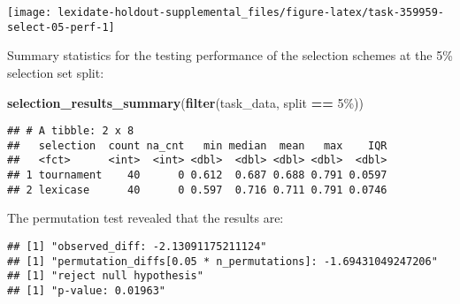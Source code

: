 \documentclass[
]{book}
\newenvironment{Shaded}{\begin{snugshade}}{\end{snugshade}}
\newcommand{\AttributeTok}[1]{\textcolor[rgb]{0.13,0.29,0.53}{#1}}
\newcommand{\DecValTok}[1]{\textcolor[rgb]{0.00,0.00,0.81}{#1}}
\newcommand{\FunctionTok}[1]{\textcolor[rgb]{0.13,0.29,0.53}{\textbf{#1}}}
\newcommand{\NormalTok}[1]{#1}
\newcommand{\OtherTok}[1]{\textcolor[rgb]{0.56,0.35,0.01}{#1}}
\newcommand{\SpecialCharTok}[1]{\textcolor[rgb]{0.81,0.36,0.00}{\textbf{#1}}}
\newcommand{\StringTok}[1]{\textcolor[rgb]{0.31,0.60,0.02}{#1}}
\begin{document}
\texttt{[image: lexidate-holdout-supplemental\_files/figure-latex/task-359959-select-05-perf-1]}

Summary statistics for the testing performance of the selection schemes at the 5\% selection set split:

\begin{Shaded}
\begin{Highlighting}[]
\FunctionTok{selection\_results\_summary}\NormalTok{(}\FunctionTok{filter}\NormalTok{(task\_data, split }\SpecialCharTok{==} \StringTok{\textquotesingle{}5\%\textquotesingle{}}\NormalTok{))}
\end{Highlighting}
\end{Shaded}

\begin{verbatim}
## # A tibble: 2 x 8
##   selection  count na_cnt   min median  mean   max    IQR
##   <fct>      <int>  <int> <dbl>  <dbl> <dbl> <dbl>  <dbl>
## 1 tournament    40      0 0.612  0.687 0.688 0.791 0.0597
## 2 lexicase      40      0 0.597  0.716 0.711 0.791 0.0746
\end{verbatim}

The permutation test revealed that the results are:

\begin{Shaded}
\end{Shaded}

\begin{verbatim}
## [1] "observed_diff: -2.13091175211124"
## [1] "permutation_diffs[0.05 * n_permutations]: -1.69431049247206"
## [1] "reject null hypothesis"
## [1] "p-value: 0.01963"
\end{verbatim}
\end{document}
